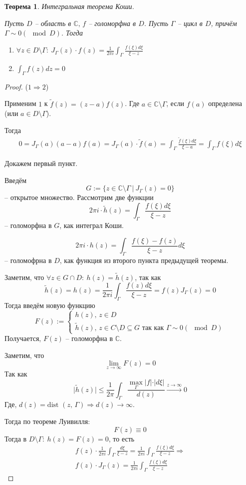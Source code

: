 \documentclass[a4paper,12pt]{article}
\renewcommand{\leq}{\ensuremath{\leqslant}}
\theoremstyle{plain}
\newtheorem{theorem}{Теорема}[section]
\theoremstyle{definition}
\theoremstyle{remark}
\begin{document}
\begin{theorem}
	Интегральная теорема Коши.

	Пусть $D$ -- область в $\mathbb{C},\, f$ -- голоморфна в $D$. Пусть $\Gamma$ -- цикл в $D$, причём $\Gamma \sim 0 (\mod D)$. Тогда
	\begin{enumerate}
		\item $\forall z \in D \setminus \Gamma :\: J_\Gamma(z)\cdot f(z) = \frac{1}{2\pi i}\int_\Gamma \frac{f(\xi)d\xi}{\xi - z}$
		\item $\int_\Gamma f(z) dz = 0$
	\end{enumerate}
\end{theorem}

\begin{proof}
	($1 \Rightarrow 2$)

	Применим $1$ к $\tilde{f}(z) = (z - a)f(z)$. Где $a \in \mathbb{C} \setminus \Gamma$, если $f(a)$ определена (или $a \in D \setminus \Gamma$).

	Тогда
	\begin{align*}
		0 = J_\Gamma(a)(a - a)f(a) = J_\Gamma(a)\cdot\tilde{f}(a) = \int_\Gamma\frac{\tilde{f}(\xi)d\xi}{\xi - a} = \int_\Gamma f(\xi)d\xi
	\end{align*}

	Докажем первый пункт.

	Введём
	\[
		G := \{z \in \mathbb{C} \setminus \Gamma \:\vert\: J_\Gamma(z) = 0\}
	\]
	-- открытое множество. Рассмотрим две функции
	\[
		2\pi i \cdot\tilde{h}(z) = \int_\Gamma\frac{f(\xi)d\xi}{\xi - z}
	\]
	-- голоморфна в $G$, как интеграл Коши.

	\[
		2\pi i\cdot h(z) = \int_\Gamma\frac{f(\xi) - f(z)}{\xi - z}d\xi
	\]
	-- голомофрна в $D$, как функция из второго пункта предыдущей теоремы.

	Заметим, что $\forall z \in G \cap D :\: h(z) = \tilde{h}(z)$, так как
	\[
		\tilde{h}(z) = h(z) = \frac{1}{2\pi i}\int_\Gamma \frac{f(z)d\xi}{\xi - z} = f(z)J_\Gamma(z) = 0
	\]
	Тогда введём новую функцию
	\[
		F(z) := \begin{cases}
			h(z),\, z \in D \\
			\tilde{h}(z),\, z \in C\setminus D \subseteq G \text{ так как } \Gamma \sim 0 (\mod D)
		\end{cases}
	\]
	Получается, $F(z)$ -- голоморфна в $\mathbb{C}$.

	Заметим, что
	\[
		\lim_{z \to \infty} F(z) = 0
	\]
	Так как
	\[
		\vert\tilde{h}(z)\vert \leq \frac{1}{2\pi}\int_\Gamma\frac{\max_\Gamma \vert f\vert\cdot\vert d\xi\vert}{d(z)} \overset{z \to \infty}{\to} 0
	\]
	Где, $d(z) = \text{dist }(z,\, \Gamma) \Rightarrow d(z) \to \infty$.

	Тогда по теореме Луивилля:
	\[
		F(z) \equiv 0
	\]
	Тогда в $D \setminus \Gamma :\: h(z) = F(z) = 0$, то есть
	\begin{align*}
		f(z)\cdot\frac{1}{2\pi i}\int_{\Gamma}\frac{d\xi}{\xi - z} = \frac{1}{2\pi i}\int_\Gamma\frac{f(\xi)d\xi}{\xi - z} \Rightarrow \\
		f(z)\cdot J_\Gamma(z) =  \frac{1}{2\pi i}\int_\Gamma\frac{f(\xi)d\xi}{\xi - z}
	\end{align*}
\end{proof}
\end{document}
